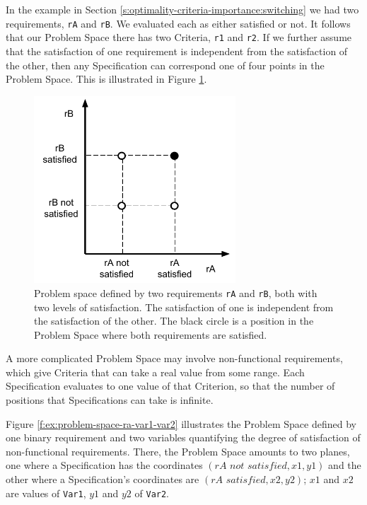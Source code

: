 \documentclass[graybox]{svmult}
\newcommand{\zi}[1]{\textit{#1}}
\newcommand{\xt}[1]{\texttt{#1}}
\newcommand{\req}[1]{\xt{#1}}
\newcommand{\ProblemSpace}{Problem Space}
\newcommand{\Specification}{Specification}
\newcommand{\Criterion}{Criterion}
\newcommand{\Criteria}{Criteria}
\begin{document}
In the example in Section \ref{s:optimality-criteria-importance:switching} we had two requirements, \req{rA} and \req{rB}. We evaluated each as either satisfied or not. It follows that our \ProblemSpace{} there has two \Criteria, \req{r1} and \req{r2}. If we further assume that the satisfaction of one requirement is independent from the satisfaction of the other, then any \Specification{} can correspond one of four points in the \ProblemSpace. This is illustrated in Figure \ref{f:ex:problem-space-ra-rb}.

\begin{figure}[t]
	\centering
	\includegraphics[height=70mm]{Figures/f-ex-problem-space-ra-rb}
\caption{Problem space defined by two requirements \req{rA} and \req{rB}, both with two levels of satisfaction. The satisfaction of one is independent from the satisfaction of the other. The black circle is a position in the \ProblemSpace{} where both requirements are satisfied.}
\label{f:ex:problem-space-ra-rb}
\end{figure}

A more complicated \ProblemSpace{} may involve non-functional requirements, which give \Criteria{} that can take a real value from some range. Each \Specification{} evaluates to one value of that \Criterion, so that the number of positions that \Specification s can take is infinite. 

Figure \ref{f:ex:problem-space-ra-var1-var2} illustrates the \ProblemSpace{} defined by one binary requirement and two variables quantifying the degree of satisfaction of non-functional requirements. There, the \ProblemSpace{} amounts to two planes, one where a \Specification{} has the coordinates $(\zi{rA not satisfied}, x1, y1)$ and the other where a Specification's coordinates are $(\zi{rA satisfied}, x2, y2)$; $x1$ and $x2$ are values of \req{Var1}, $y1$ and $y2$ of \req{Var2}.
\end{document}

